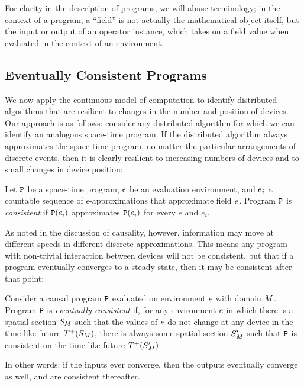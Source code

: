 \documentclass[12pt,a4paper,twoside,openright]{book}
\begin{document}
For clarity in the description of programs, we will abuse terminology; in the context of a program, a ``field'' is not actually the mathematical object itself, but the input or output of an operator instance, which takes on a field value when evaluated in the context of an environment.

\subsection{Eventually Consistent Programs}

We now apply the continuous model of computation to identify distributed algorithms that are resilient to changes in the number and position of devices.
%
Our approach is as follows: consider any distributed algorithm for which we can identify an analogous space-time program.
%
If the distributed algorithm always approximates the space-time program, no matter the particular arrangements of discrete events, then it is clearly resilient to increasing numbers of devices and to small changes in device position:
%
\begin{thrdefn}
  Let $\texttt{P}$ be a space-time program, $e$ be an evaluation environment, and $e_i$ a countable sequence of $\epsilon$-approximations that approximate field $e$.
  Program $\texttt{P}$ is {\em consistent} if $\texttt{P}(e_i)$ approximates $\texttt{P}(e_i)$ for every $e$ and $e_i$.
\end{thrdefn}
\noindent
As noted in the discussion of causality, however, information may move at different speeds in different discrete approximations.  This means any program with non-trivial interaction between devices will not be consistent, but that if a program eventually converges to a steady state, then it may be consistent after that point:
\begin{thrdefn}
  Consider a causal program $\texttt{P}$ evaluated on environment $e$ with domain $M$.  Program $\texttt{P}$ is {\em eventually consistent} if, for any environment $e$ in which there is a spatial section $S_{M}$ such that the values of $e$ do not change at any device in the time-like future $T^+({S_{M}})$, there is always some spatial section $S_{M}'$ such that $\texttt{P}$ is consistent on the time-like future $T^+({S_{M}'})$.
\end{thrdefn}
\noindent
In other words: if the inputs ever converge, then the outputs eventually converge as well, and are consistent thereafter.
\end{document}

